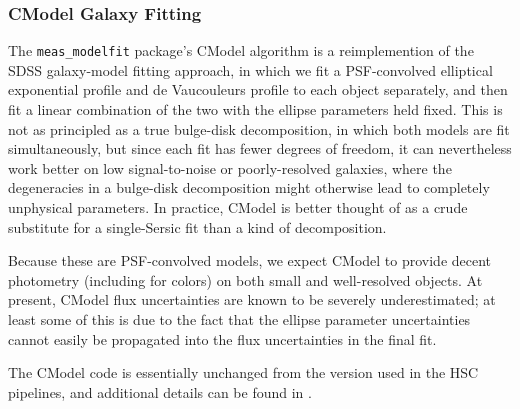 \subsubsection{CModel Galaxy Fitting}
\label{sec:cmodel}

The \texttt{meas\_modelfit} package's CModel algorithm is a reimplemention of the SDSS galaxy-model fitting approach, in which we fit a PSF-convolved elliptical exponential profile and de Vaucouleurs profile to each object separately, and then fit a linear combination of the two with the ellipse parameters held fixed.
This is not as principled as a true bulge-disk decomposition, in which both models are fit simultaneously, but since each fit has fewer degrees of freedom, it can nevertheless work better on low signal-to-noise or poorly-resolved galaxies, where the degeneracies in a bulge-disk decomposition might otherwise lead to completely unphysical parameters.
In practice, CModel is better thought of as a crude substitute for a single-Sersic fit than a kind of decomposition.

Because these are PSF-convolved models, we expect CModel to provide decent photometry (including for colors) on both small and well-resolved objects.
At present, CModel flux uncertainties are known to be severely underestimated; at least some of this is due to the fact that the ellipse parameter uncertainties cannot easily be propagated into the flux uncertainties in the final fit.

The CModel code is essentially unchanged from the version used in the HSC pipelines, and additional details can be found in \citet{2018PASJ...70S...5B}.
